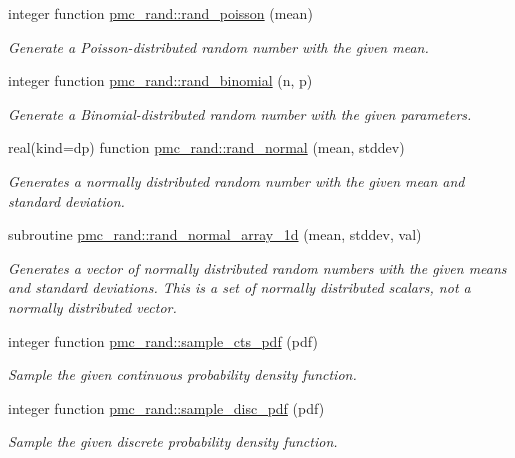 \begin{DoxyCompactItemize}
integer function \mbox{\hyperlink{namespacepmc__rand_a815e907dd53313f0bc950a71c72c5bb4}{pmc\+\_\+rand\+::rand\+\_\+poisson}} (mean)
\begin{DoxyCompactList}\small\item\em Generate a Poisson-\/distributed random number with the given mean. \end{DoxyCompactList}\item 
integer function \mbox{\hyperlink{namespacepmc__rand_a4f8465fceab04e6f853f484509121fc1}{pmc\+\_\+rand\+::rand\+\_\+binomial}} (n, p)
\begin{DoxyCompactList}\small\item\em Generate a Binomial-\/distributed random number with the given parameters. \end{DoxyCompactList}\item 
real(kind=dp) function \mbox{\hyperlink{namespacepmc__rand_ad0761e89156bd0a92a7d3a504d4c95fb}{pmc\+\_\+rand\+::rand\+\_\+normal}} (mean, stddev)
\begin{DoxyCompactList}\small\item\em Generates a normally distributed random number with the given mean and standard deviation. \end{DoxyCompactList}\item 
subroutine \mbox{\hyperlink{namespacepmc__rand_a5ebdbd9553832208d4a3a43112550ca4}{pmc\+\_\+rand\+::rand\+\_\+normal\+\_\+array\+\_\+1d}} (mean, stddev, val)
\begin{DoxyCompactList}\small\item\em Generates a vector of normally distributed random numbers with the given means and standard deviations. This is a set of normally distributed scalars, not a normally distributed vector. \end{DoxyCompactList}\item 
integer function \mbox{\hyperlink{namespacepmc__rand_a69a67c16e1e0a2ea9946e307775237e8}{pmc\+\_\+rand\+::sample\+\_\+cts\+\_\+pdf}} (pdf)
\begin{DoxyCompactList}\small\item\em Sample the given continuous probability density function. \end{DoxyCompactList}\item 
integer function \mbox{\hyperlink{namespacepmc__rand_a38a356c6ac89e03417f24d20f31e7d6e}{pmc\+\_\+rand\+::sample\+\_\+disc\+\_\+pdf}} (pdf)
\begin{DoxyCompactList}\small\item\em Sample the given discrete probability density function. \end{DoxyCompactList}\item 

\end{DoxyCompactItemize}
